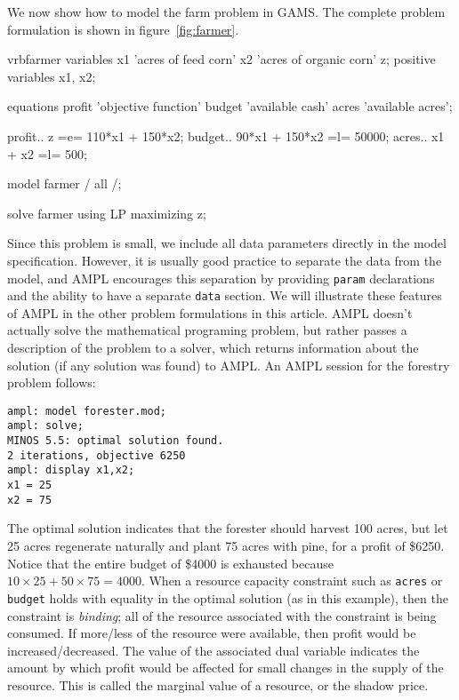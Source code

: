 We now show how to model the farm problem in GAMS.
The complete problem formulation is shown in
figure~\ref{fig:farmer}.

\begin{SaveVerbatim}{vrbfarmer}
variables
x1 'acres of feed corn'
x2 'acres of organic corn'
z;
positive variables x1, x2;

equations
 profit  'objective function'
 budget  'available cash'
 acres   'available acres';

profit.. z =e= 110*x1 + 150*x2;
budget.. 90*x1 + 150*x2 =l= 50000;
acres.. x1 + x2 =l= 500;

model farmer / all /;

solve farmer using LP maximizing z;
\end{SaveVerbatim}

\begin{figure}
\end{figure}


Since this problem is small, we include all data parameters directly
in the model specification. However, it is usually good practice to
separate the data from the model, and AMPL encourages this separation
by providing \texttt{param} declarations and the ability to have a
separate \texttt{data} section. We will illustrate these features of
AMPL in the other problem formulations in this article.  AMPL doesn't
actually solve the mathematical programing problem, but rather passes
a description of the problem to a solver, which returns information
about the solution (if any solution was found) to AMPL. An AMPL
session for the forestry problem follows:

\begin{Verbatim}[samepage=true]
ampl: model forester.mod;
ampl: solve;
MINOS 5.5: optimal solution found.
2 iterations, objective 6250
ampl: display x1,x2;
x1 = 25
x2 = 75
\end{Verbatim}

The optimal solution indicates that the forester should harvest 100
acres, but let 25 acres regenerate naturally and plant 75 acres with
pine, for a profit of \$6250. Notice that the entire budget of \$4000
is exhausted because $10 \times 25 + 50 \times 75 = 4000$. When a
resource capacity constraint such as \texttt{acres} or \texttt{budget}
holds with equality in the optimal solution (as in this example), then
the constraint is \emph{binding}; all of the resource associated with
the constraint is being consumed. If more/less of the resource were
available, then profit would be increased/decreased. The value of the
associated dual variable indicates the amount by which profit would be
affected for small changes in the supply of the resource. This is
called the marginal value of a resource, or the shadow price.


